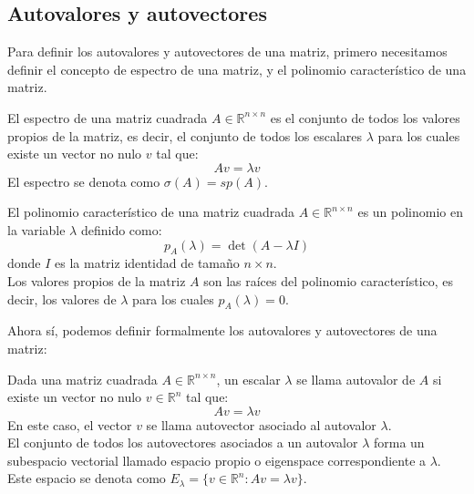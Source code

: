 \subsection{Autovalores y autovectores}

Para definir los autovalores y autovectores de una matriz, primero necesitamos definir el concepto de espectro de una matriz, y el polinomio característico de una matriz.\\

\begin{definición}
    El espectro de una matriz cuadrada $ A \in \mathbb{R}^{n \times n} $ es el conjunto de todos los valores propios de la matriz, es decir, el conjunto de todos los escalares $ \lambda $ para los cuales existe un vector no nulo $ v $ tal que:
    \[
        Av = \lambda v
    \]
    El espectro se denota como $\sigma(A) = sp(A)$.
\end{definición}

\begin{definición}
    El polinomio característico de una matriz cuadrada $ A \in \mathbb{R}^{n \times n} $ es un polinomio en la variable $ \lambda $ definido como:
    \[
        p_A(\lambda) = \det(A - \lambda I)
    \]
    donde $ I $ es la matriz identidad de tamaño $ n \times n $.\\
    Los valores propios de la matriz $ A $ son las raíces del polinomio característico, es decir, los valores de $ \lambda $ para los cuales $ p_A(\lambda) = 0 $.
\end{definición}

Ahora sí, podemos definir formalmente los autovalores y autovectores de una matriz:

\begin{definición}
    Dada una matriz cuadrada $ A \in \mathbb{R}^{n \times n} $, un escalar $ \lambda $ se llama autovalor de $ A $ si existe un vector no nulo $ v \in \mathbb{R}^n $ tal que:
    \[
        Av = \lambda v
    \]
    En este caso, el vector $ v $ se llama autovector asociado al autovalor $ \lambda $.\\
    El conjunto de todos los autovectores asociados a un autovalor $ \lambda $ forma un subespacio vectorial llamado espacio propio o eigenspace correspondiente a $ \lambda $. Este espacio se denota como $ E_\lambda = \{ v \in \mathbb{R}^n : Av = \lambda v \} $.
\end{definición}

